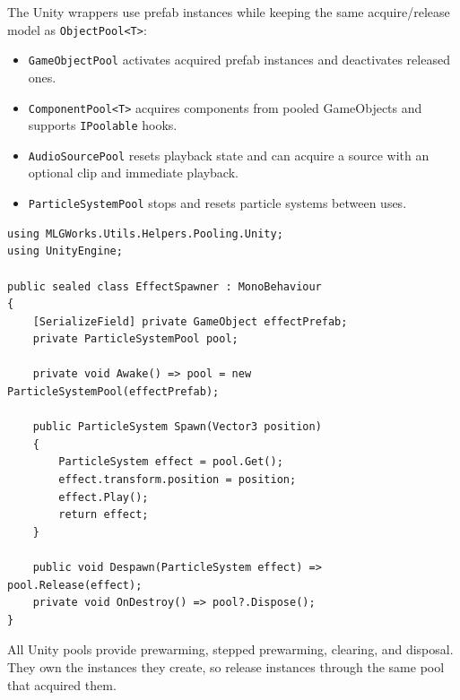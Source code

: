 The Unity wrappers use prefab instances while keeping the same acquire/release model as \texttt{ObjectPool<T>}:
\begin{itemize}
  \item \texttt{GameObjectPool} activates acquired prefab instances and deactivates released ones.
  \item \texttt{ComponentPool<T>} acquires components from pooled GameObjects and supports \texttt{IPoolable} hooks.
  \item \texttt{AudioSourcePool} resets playback state and can acquire a source with an optional clip and immediate playback.
  \item \texttt{ParticleSystemPool} stops and resets particle systems between uses.
\end{itemize}

\begin{lstlisting}
using MLGWorks.Utils.Helpers.Pooling.Unity;
using UnityEngine;

public sealed class EffectSpawner : MonoBehaviour
{
    [SerializeField] private GameObject effectPrefab;
    private ParticleSystemPool pool;

    private void Awake() => pool = new ParticleSystemPool(effectPrefab);

    public ParticleSystem Spawn(Vector3 position)
    {
        ParticleSystem effect = pool.Get();
        effect.transform.position = position;
        effect.Play();
        return effect;
    }

    public void Despawn(ParticleSystem effect) => pool.Release(effect);
    private void OnDestroy() => pool?.Dispose();
}
\end{lstlisting}

All Unity pools provide prewarming, stepped prewarming, clearing, and disposal. They own the instances they create, so release instances through the same pool that acquired them.
